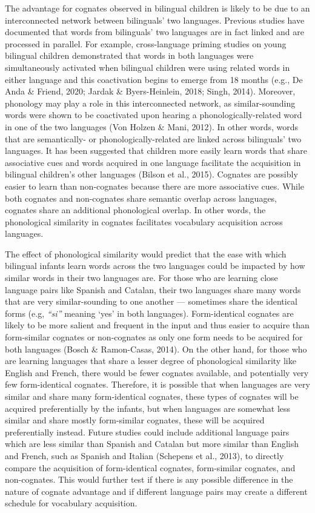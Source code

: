 \documentclass[
  english,
  ,man,floatsintext]{apa6}
\begin{document}
The advantage for cognates observed in bilingual children is likely to be due to an interconnected network between bilinguals' two languages. Previous studies have documented that words from bilinguals' two languages are in fact linked and are processed in parallel. For example, cross-language priming studies on young bilingual children demonstrated that words in both languages were simultaneously activated when bilingual children were using related words in either language and this coactivation begins to emerge from 18 months (e.g., De Anda \& Friend, 2020; Jardak \& Byers-Heinlein, 2018; Singh, 2014). Moreover, phonology may play a role in this interconnected network, as similar-sounding words were shown to be coactivated upon hearing a phonologically-related word in one of the two languages (Von Holzen \& Mani, 2012). In other words, words that are semantically- or phonologically-related are linked across bilinguals' two languages. It has been suggested that children more easily learn words that share associative cues and words acquired in one language facilitate the acquisition in bilingual children's other languages (Bilson et al., 2015). Cognates are possibly easier to learn than non-cognates because there are more associative cues. While both cognates and non-cognates share semantic overlap across languages, cognates share an additional phonological overlap. In other words, the phonological similarity in cognates facilitates vocabulary acquisition across languages.

The effect of phonological similarity would predict that the ease with which bilingual infants learn words across the two languages could be impacted by how similar words in their two languages are. For those who are learning close language pairs like Spanish and Catalan, their two languages share many words that are very similar-sounding to one another --- sometimes share the identical forms (e.g, \emph{``si''} meaning `yes' in both languages). Form-identical cognates are likely to be more salient and frequent in the input and thus easier to acquire than form-similar cognates or non-cognates as only one form needs to be acquired for both languages (Bosch \& Ramon-Casas, 2014). On the other hand, for those who are learning languages that share a lesser degree of phonological similarity like English and French, there would be fewer cognates available, and potentially very few form-identical cognates. Therefore, it is possible that when languages are very similar and share many form-identical cognates, these types of cognates will be acquired preferentially by the infants, but when languages are somewhat less similar and share mostly form-similar cognates, these will be acquired preferentially instead. Future studies could include additional language pairs which are less similar than Spanish and Catalan but more similar than English and French, such as Spanish and Italian (Schepens et al., 2013), to directly compare the acquisition of form-identical cognates, form-similar cognates, and non-cognates. This would further test if there is any possible difference in the nature of cognate advantage and if different language pairs may create a different schedule for vocabulary acquisition.
\end{document}
